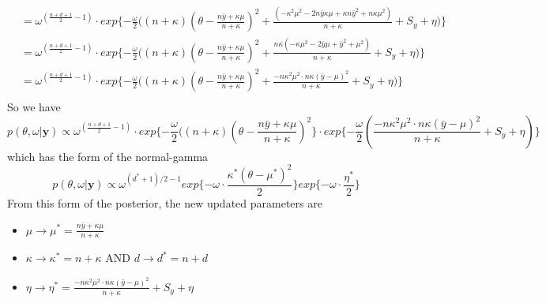 \documentclass{homework}
\begin{document}
\begin{enumerate}[label=(\Alph*)]
\begin{equation}
\begin{split}
& = \omega^{( \frac{n + d + 1}{2} - 1)} \cdot exp\{ -\frac{\omega}{2}  \big( (n + \kappa)( \theta - \frac{n\bar{y} + \kappa\mu}{n + \kappa})^2 + \frac{( - \kappa^2\mu^2 - 2n\bar{y}\kappa\mu + \kappa n\bar{y}^2 + n\kappa\mu^2)}{n + \kappa} +  S_y + \eta \big) \}\\
& = \omega^{( \frac{n + d + 1}{2} - 1)} \cdot exp\{ -\frac{\omega}{2}  \big( (n + \kappa)( \theta - \frac{n\bar{y} + \kappa\mu}{n + \kappa})^2 + \frac{n\kappa( - \kappa\mu^2 - 2\bar{y}\mu + \bar{y}^2 + \mu^2)}{n + \kappa} +  S_y + \eta \big) \}\\
& = \omega^{( \frac{n + d + 1}{2} - 1)} \cdot exp\{ -\frac{\omega}{2}  \big( (n + \kappa)( \theta - \frac{n\bar{y} + \kappa\mu}{n + \kappa})^2 + \frac{-n\kappa^2\mu^2 \cdot n\kappa( \bar{y} - \mu)^2}{n + \kappa} +  S_y + \eta \big) \}\\
\end{split} \end{equation}
So we have 
$$p( \theta, \omega | \textbf{y})  \propto \omega^{( \frac{n + d + 1}{2} - 1)}  \cdot exp\{ -\frac{\omega}{2}  \big( (n + \kappa)( \theta - \frac{n\bar{y} + \kappa\mu}{n + \kappa})^2\} \cdot exp\{ -\frac{\omega}{2}(\frac{-n\kappa^2\mu^2 \cdot n\kappa( \bar{y} - \mu)^2}{n + \kappa} +  S_y + \eta) \}$$
which has the form of the normal-gamma
$$ p(\theta, \omega | \textbf{y}) \propto \omega^{(d^*+1)/2 - 1}exp\{ -\omega \cdot \frac{\kappa^*(\theta - \mu^*)^2}{2}\}exp\{-\omega \cdot \frac{\eta^*}{2}\}$$
From this form of the posterior, the new updated parameters are 
\begin{itemize}
\item $\mu \rightarrow \mu^* =  \frac{n\bar{y} + \kappa\mu}{n + \kappa}$
\item $\kappa \rightarrow \kappa^* = n + \kappa$  AND $d \rightarrow d^* = n + d$  
\item $\eta \rightarrow \eta^* = \frac{-n\kappa^2\mu^2 \cdot n\kappa( \bar{y} - \mu)^2}{n + \kappa} +  S_y + \eta$
\end{itemize}


\end{enumerate}
\end{document}
